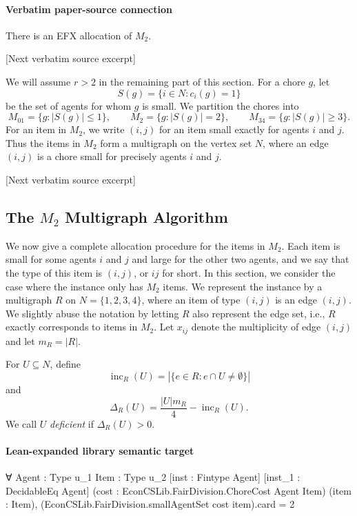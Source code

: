 \documentclass[10pt]{article}
\begin{document}
\paragraph{Verbatim paper-source connection}
\begin{ReviewVerbatim}
\begin{lemma}\label{lem:M2}
There is an EFX allocation of $M_2$.
\end{lemma}

[Next verbatim source excerpt]

We will assume $r>2$ in the remaining part of this section.
For a chore $g$, let
\[
 S(g)=\{i\in N:c_i(g)=1\}
\]
be the set of agents for whom $g$ is small.  We partition the chores into
\[
M_{01}=\{g:|S(g)|\le 1\},\qquad
M_2=\{g:|S(g)|=2\},\qquad
M_{34}=\{g:|S(g)|\ge 3\}.
\]
For an item in $M_2$, we write $(i,j)$ for an item small exactly for agents
$i$ and $j$.  Thus the items in $M_2$ form a multigraph on the vertex set
$N$, where an edge $(i,j)$ is a chore small for precisely agents $i$ and $j$.

[Next verbatim source excerpt]

\subsection{The $M_2$ Multigraph Algorithm}
\label{subsec:2}
We now give a complete allocation procedure for the items in $M_2$.
Each item is small for some agents $i$ and $j$ and
large for the other two agents, and we say that the type of this item is $(i,j)$, or $ij$ for short.
In this section, we consider the case where the instance only has $M_{2}$ items.
We represent the instance by a
multigraph $R$ on $N=\{1,2,3,4\}$, where an item of type $(i,j)$ is an edge $(i,j)$.
We slightly abuse the notation by letting $R$ also represent the edge set, i.e., $R$ exactly corresponds to items in $M_2$.
Let $x_{ij}$ denote the multiplicity of edge $(i,j)$ and let $m_R=|R|$.

For $U\subseteq N$, define
\[
 \operatorname{inc}_R(U)=\left|\{e\in R:e\cap U\neq\emptyset\}\right|
\]
and
\[
 \Delta_R(U)=\frac{|U|m_R}{4}-\operatorname{inc}_R(U).
\]
We call $U$ \emph{deficient} if $\Delta_R(U)>0$.
\end{ReviewVerbatim}

\paragraph{Lean-expanded library semantic target}
\begin{ReviewVerbatim}
∀ {Agent : Type u_1} {Item : Type u_2} [inst : Fintype Agent] [inst_1 : DecidableEq Agent]
  (cost : EconCSLib.FairDivision.ChoreCost Agent Item) (item : Item),
  (EconCSLib.FairDivision.smallAgentSet cost item).card = 2
\end{ReviewVerbatim}
\end{document}
